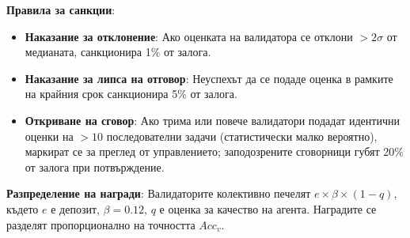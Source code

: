 \documentclass[11pt]{article}
\begin{document}
\textbf{Правила за санкции}:
\begin{itemize}[noitemsep]
  \item \textbf{Наказание за отклонение}: Ако оценката на валидатора се отклони $>2\sigma$ от медианата, санкционира 1\% от залога.
  \item \textbf{Наказание за липса на отговор}: Неуспехът да се подаде оценка в рамките на крайния срок санкционира 5\% от залога.
  \item \textbf{Откриване на сговор}: Ако трима или повече валидатори подадат идентични оценки на $>10$ последователни задачи (статистически малко вероятно), маркират се за преглед от управлението; заподозрените сговорници губят 20\% от залога при потвърждение.
\end{itemize}
\textbf{Разпределение на награди}: Валидаторите колективно печелят $e \times \beta \times (1-q)$, където $e$ е депозит, $\beta=0.12$, $q$ е оценка за качество на агента. Наградите се разделят пропорционално на точността $Acc_v$.
\end{document}
